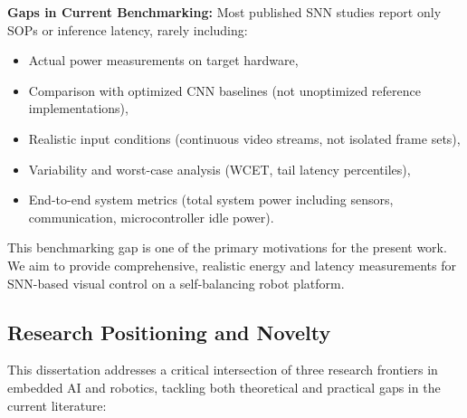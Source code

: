 \textbf{Gaps in Current Benchmarking:} Most published SNN studies report only SOPs or inference latency, rarely 
including:
\begin{itemize}
    \item Actual power measurements on target hardware,
    \item Comparison with optimized CNN baselines (not unoptimized reference implementations),
    \item Realistic input conditions (continuous video streams, not isolated frame sets),
    \item Variability and worst-case analysis (WCET, tail latency percentiles),
    \item End-to-end system metrics (total system power including sensors, communication, microcontroller idle power).
\end{itemize}

This benchmarking gap is one of the primary motivations for the present work. We aim to provide comprehensive, 
realistic energy and latency measurements for SNN-based visual control on a self-balancing robot platform.


\subsection{Research Positioning and Novelty}

This dissertation addresses a critical intersection of three research frontiers in embedded AI and robotics, 
tackling both theoretical and practical gaps in the current literature:


